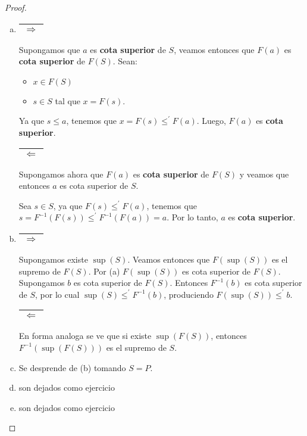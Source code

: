   \begin{proof}
    \begin{enumerate}[a)]
      \item \begin{tabular}{|c|} \hline $\Rightarrow$ \\\hline \end{tabular} Supongamos que $a$ es \textbf{cota
        superior} de $S$, veamos entonces que $F(a)$ es \textbf{cota superior} de $F(S)$. Sean:
        \begin{itemize}
          \item $x \in F(S)$
          \item $s \in S$ tal que $x = F(s)$.
        \end{itemize}

        \PN Ya que $s \leq a$, tenemos que $x = F(s) \leq^{\prime} F(a)$. Luego, $F(a)$ es \textbf{cota superior}.

        \PN \begin{tabular}{|c|} \hline $\Leftarrow$ \\\hline \end{tabular} Supongamos ahora que $F(a)$ es \textbf{cota
        superior} de $F(S)$ y veamos que entonces $a$ es cota superior de $S$.

        \PN Sea $s \in S$, ya que $F(s) \leq^{\prime} F(a)$, tenemos que $s = F^{-1}(F(s)) \leq^{\prime} F^{-1}(F(a)) =
        a$. Por lo tanto, $a$ es \textbf{cota superior}.

      \item \begin{tabular}{|c|} \hline $\Rightarrow$ \\\hline \end{tabular} Supongamos existe $\sup (S)$. Veamos entonces que $F(\sup (S))$ es el supremo de $F(S)$. Por (a) $F(\sup (S))$ es cota superior de $F(S)$.
      Supongamos $b$ es cota superior de $F(S)$. Entonces $F^{-1}(b)$ es cota superior de $S$, por lo cual $\sup (S)\leq ^{\prime }F^{-1}(b)$, produciendo $F(\sup (S))\leq ^{\prime }b$.

      \PN \begin{tabular}{|c|} \hline $\Leftarrow$ \\\hline \end{tabular} En forma analoga se ve que si existe $\sup (F(S))$, entonces $F^{-1}(\sup (F(S)))$ es el supremo de $S$.

      \item Se desprende de (b) tomando $S=P$.
      \item son dejados como ejercicio
      \item son dejados como ejercicio
    \end{enumerate}
  \end{proof}

